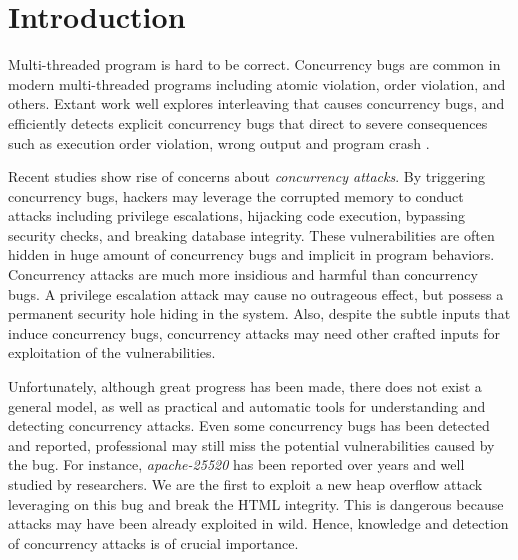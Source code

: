 \section{Introduction} \label{sec:intro}


Multi-threaded program is hard to be correct. 
Concurrency bugs are common in modern multi-threaded programs  
including atomic violation, order violation, and others.
Extant work well explores interleaving that causes concurrency bugs, 
and efficiently detects explicit concurrency bugs that direct to  
severe consequences such as execution order violation, wrong output and program crash
\cite{wu2015:collaborative,tsan,valgrind:pldi,lu:muvi:sosp,conseq:asplos11,conmem:asplos10}.

Recent studies\cite{acidrain:sigmod17,con:hotpar12} show rise of concerns about \emph{concurrency attacks}.
By triggering concurrency bugs, 
hackers may leverage the corrupted memory to conduct  
attacks including privilege escalations\cite{uselib-bug-12791,mysql-bug-14747}, hijacking code execution\cite{msiexploit}, bypassing security checks\cite{cve-2008-0034,cve-2010-0923,cve-2010-1754}, 
and breaking database integrity\cite{acidrain:sigmod17}.
These vulnerabilities are often hidden in huge amount of concurrency bugs and implicit in program behaviors. 
Concurrency attacks are much more insidious and harmful than concurrency bugs. 
A privilege escalation attack may cause no outrageous effect, 
but possess a permanent security hole hiding in the system.
Also, despite the subtle inputs that induce concurrency bugs, 
concurrency attacks may need other crafted inputs for exploitation of the vulnerabilities. 



Unfortunately, although great progress has been made, there does not exist a general model,
as well as practical and automatic tools for understanding and detecting concurrency attacks. 
Even some concurrency bugs has been detected and reported, 
professional may still miss the potential vulnerabilities caused by the bug. 
For instance, \emph{apache-25520}\cite{apache-bug-25520} has been 
reported over years and well studied by researchers\cite{lu:concurrency-bugs}.  
We are the first to exploit a new heap overflow attack leveraging on this bug and break the HTML integrity. 
This is dangerous because attacks may have been already exploited in wild. 
Hence, knowledge and detection of concurrency attacks is of crucial importance. 

